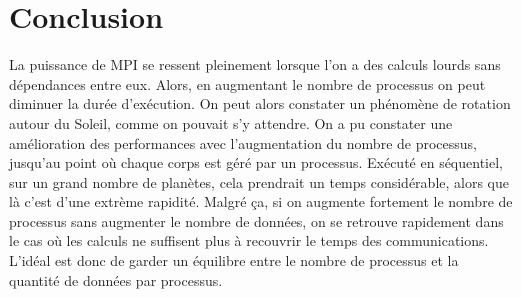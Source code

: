 \documentclass[a4paper,11pt]{article}
\begin{document}
\section{Conclusion}


La puissance de MPI se ressent pleinement lorsque l'on a des calculs lourds sans dépendances entre eux. Alors, en augmentant le nombre de processus on peut diminuer la durée d'exécution. On peut alors constater un phénomène de rotation autour du Soleil, comme on pouvait s'y attendre. On a pu constater une amélioration des performances avec l'augmentation du nombre de processus, jusqu'au point où chaque corps est géré par un processus. Exécuté en séquentiel, sur un grand nombre de planètes, cela prendrait un temps considérable, alors que là c'est d'une extrème rapidité. Malgré ça, si on augmente fortement le nombre de processus sans augmenter le nombre de données, on se retrouve rapidement dans le cas où les calculs ne suffisent plus à recouvrir le temps des communications. L'idéal est donc de garder un équilibre entre le nombre de processus et la quantité de données par processus.
\end{document}
